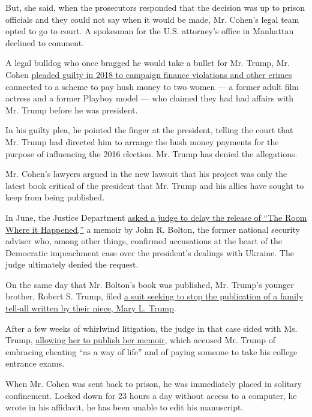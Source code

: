 But, she said, when the prosecutors responded that the decision was up
to prison officials and they could not say when it would be made, Mr.
Cohen's legal team opted to go to court. A spokesman for the U.S.
attorney's office in Manhattan declined to comment.

A legal bulldog who once bragged he would take a bullet for Mr. Trump,
Mr. Cohen
\href{https://slack-redir.net/link?url=https\%3A\%2F\%2Fwww.nytimes.com\%2F2018\%2F08\%2F21\%2Fnyregion\%2Fmichael-cohen-guilty-plea-trump-takeaways.html}{pleaded
guilty in 2018 to campaign finance violations and other crimes}
connected to a scheme to pay hush money to two women --- a former adult
film actress and a former Playboy model --- who claimed they had had
affairs with Mr. Trump before he was president.

In his guilty plea, he pointed the finger at the president, telling the
court that Mr. Trump had directed him to arrange the hush money payments
for the purpose of influencing the 2016 election. Mr. Trump has denied
the allegations.

Mr. Cohen's lawyers argued in the new lawsuit that his project was only
the latest book critical of the president that Mr. Trump and his allies
have sought to keep from being published.

In June, the Justice Department
\href{https://www.nytimes.com/2020/06/16/us/politics/john-bolton-book-publication.html}{asked
a judge to delay the release of ``The Room Where it Happened,''} a
memoir by John R. Bolton, the former national security adviser who,
among other things, confirmed accusations at the heart of the Democratic
impeachment case over the president's dealings with Ukraine. The judge
ultimately denied the request.

On the same day that Mr. Bolton's book was published, Mr. Trump's
younger brother, Robert S. Trump, filed
\href{https://www.nytimes.com/2020/06/23/us/politics/mary-trump-book-court.html}{a
suit seeking to stop the publication of a family tell-all written by
their niece, Mary L. Trump}.

After a few weeks of whirlwind litigation, the judge in that case sided
with Ms. Trump,
\href{https://www.nytimes.com/2020/07/07/us/politics/mary-trump-book.html}{allowing
her to publish her memoir}, which accused Mr. Trump of embracing
cheating ``as a way of life'' and of paying someone to take his college
entrance exams.

When Mr. Cohen was sent back to prison, he was immediately placed in
solitary confinement. Locked down for 23 hours a day without access to a
computer, he wrote in his affidavit, he has been unable to edit his
manuscript.

